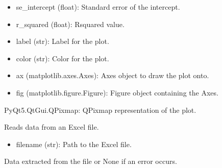 \documentclass[a4paper,10pt,english]{sphinxmanual}
\begin{document}
\begin{fulllineitems}
\begin{description}
\begin{itemize}
\item {} 
\sphinxAtStartPar
se\_intercept (float): Standard error of the intercept.

\item {} 
\sphinxAtStartPar
r\_squared (float): R\sphinxhyphen{}squared value.

\item {} 
\sphinxAtStartPar
label (str): Label for the plot.

\item {} 
\sphinxAtStartPar
color (str): Color for the plot.

\item {} 
\sphinxAtStartPar
ax (matplotlib.axes.Axes): Axes object to draw the plot onto.

\item {} 
\sphinxAtStartPar
fig (matplotlib.figure.Figure): Figure object containing the Axes.

\end{itemize}

\sphinxAtStartPar
PyQt5.QtGui.QPixmap: QPixmap representation of the plot.

\end{description}

\end{fulllineitems}


\begin{fulllineitems}
\label{\detokenize{utils:src.utils.regression_analysis.read_data}}
\pysigstartsignatures
{}
\pysigstopsignatures
\sphinxAtStartPar
Reads data from an Excel file.
\begin{description}
\begin{itemize}
\item {} 
\sphinxAtStartPar
filename (str): Path to the Excel file.

\end{itemize}

\sphinxAtStartPar
Data extracted from the file or None if an error occurs.

\end{description}

\end{fulllineitems}
\end{document}
